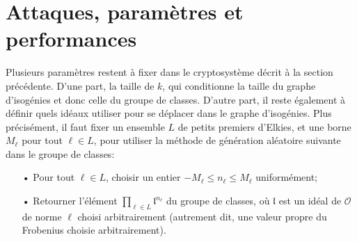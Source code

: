 \documentclass[11pt,a4paper]{article}
\newcommand{\F}{\mathbb{F}}
\renewcommand{\O}{\mathcal{O}}
\renewcommand{\frak}{\mathfrak}
\theoremstyle{definition}
\begin{document}
%
%
%

\newpage
\section{Attaques, paramètres et performances}

Plusieurs paramètres restent à fixer dans le cryptosystème décrit à la section précédente. D'une part, la taille de $k$, qui conditionne la taille du graphe d'isogénies et donc celle du groupe de classes. D'autre part, il reste également à définir quels idéaux utiliser pour se déplacer dans le graphe d'isogénies. Plus précisément, il faut fixer un ensemble $L$ de petits premiers d'Elkies, et une borne $M_\ell$ pour tout $\ell\in L$, pour utiliser la méthode de génération aléatoire suivante dans le groupe de classes:
\begin{itemize}
\item[•] Pour tout $\ell\in L$, choisir un entier $- M_\ell\leq n_\ell\leq M_\ell$ uniformément;
\item[•] Retourner l'élément $\prod_{\ell\in L} {\frak l}^{n_\ell}$ du groupe de classes, où $\frak l$ est un idéal de $\O$ de norme $\ell$ choisi arbitrairement (autrement dit, une valeur propre du Frobenius choisie arbitrairement).
\end{itemize}
\end{document}
